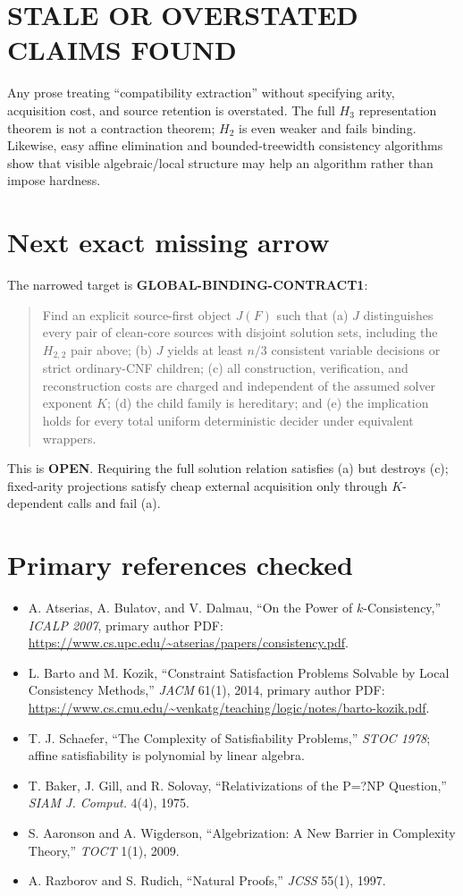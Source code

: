 \documentclass[11pt]{article}
\newcommand{\status}[1]{\textbf{#1}}
\begin{document}
\section{STALE OR OVERSTATED CLAIMS FOUND}
Any prose treating ``compatibility extraction'' without specifying arity, acquisition cost, and source retention is overstated.  The full $H_3$ representation theorem is not a contraction theorem; $H_2$ is even weaker and fails binding.  Likewise, easy affine elimination and bounded-treewidth consistency algorithms show that visible algebraic/local structure may help an algorithm rather than impose hardness.

\section{Next exact missing arrow}
The narrowed target is \textbf{GLOBAL-BINDING-CONTRACT1}:
\begin{quote}
Find an explicit source-first object $J(F)$ such that (a) $J$ distinguishes every pair of clean-core sources with disjoint solution sets, including the $H_{2,2}$ pair above; (b) $J$ yields at least $n/3$ consistent variable decisions or strict ordinary-CNF children; (c) all construction, verification, and reconstruction costs are charged and independent of the assumed solver exponent $K$; (d) the child family is hereditary; and (e) the implication holds for every total uniform deterministic decider under equivalent wrappers.
\end{quote}
This is \status{OPEN}.  Requiring the full solution relation satisfies (a) but destroys (c); fixed-arity projections satisfy cheap external acquisition only through $K$-dependent calls and fail (a).

\section*{Primary references checked}
\begin{itemize}[leftmargin=2em]
\item A. Atserias, A. Bulatov, and V. Dalmau, ``On the Power of $k$-Consistency,'' \emph{ICALP 2007}, primary author PDF: \url{https://www.cs.upc.edu/~atserias/papers/consistency.pdf}.
\item L. Barto and M. Kozik, ``Constraint Satisfaction Problems Solvable by Local Consistency Methods,'' \emph{JACM} 61(1), 2014, primary author PDF: \url{https://www.cs.cmu.edu/~venkatg/teaching/logic/notes/barto-kozik.pdf}.
\item T. J. Schaefer, ``The Complexity of Satisfiability Problems,'' \emph{STOC 1978}; affine satisfiability is polynomial by linear algebra.
\item T. Baker, J. Gill, and R. Solovay, ``Relativizations of the P=?NP Question,'' \emph{SIAM J. Comput.} 4(4), 1975.
\item S. Aaronson and A. Wigderson, ``Algebrization: A New Barrier in Complexity Theory,'' \emph{TOCT} 1(1), 2009.
\item A. Razborov and S. Rudich, ``Natural Proofs,'' \emph{JCSS} 55(1), 1997.
\end{itemize}
\end{document}
